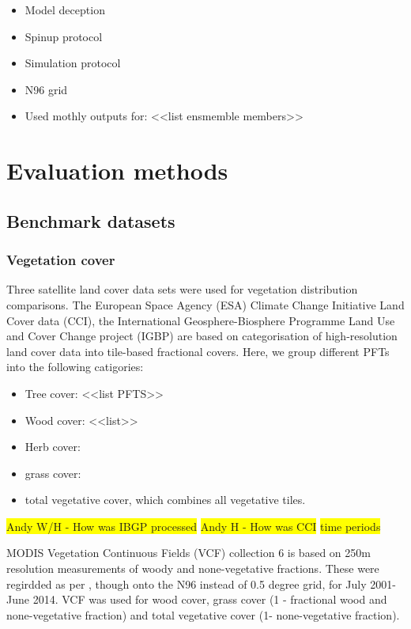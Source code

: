 \documentclass[bg, manuscript]{copernicus}
\newcommand{\hilight}[1]{\colorbox{yellow}{#1}}
\begin{document}
 
\begin{itemize}
    \item Model deception \citep{Sellar2019-bo}
    \item Spinup protocol \citep{yool2020spin}
    \item Simulation protocol \citep{sellar2020implementation}
    \item N96 grid
    \item Used mothly outputs for: <<list ensmemble members>>
\end{itemize}

\section{Evaluation methods}

\subsection{Benchmark datasets}

\subsubsection{Vegetation cover}
Three satellite land cover data sets were used for vegetation distribution comparisons. The European Space Agency (ESA) Climate Change Initiative Land Cover data (CCI)\cite{hartley2017uncertainty}, the International Geosphere-Biosphere Programme Land Use and Cover Change project (IGBP) \citep{Loveland2000-sx} are based on categorisation of high-resolution land cover data into tile-based fractional covers. Here, we group different PFTs into the following catigories:
\begin{itemize}
    \item Tree cover: <<list PFTS>>
    \item Wood cover: <<list>>
    \item Herb cover: 
    \item grass cover:
    \item total vegetative cover, which combines all vegetative tiles.
\end{itemize}

\hilight{Andy W/H - How was IBGP processed}
\hilight{Andy H - How was CCI}
\hilight{time periods}

MODIS Vegetation Continuous Fields (VCF) collection 6 \citep{Dimiceli_undated-el} is based on 250m resolution measurements of woody and none-vegetative fractions. These were regirdded as per \citep{Kelley2019-yu}, though onto the N96 instead of 0.5 degree grid, for July 2001- June 2014. VCF was used for wood cover, grass cover (1 - fractional wood and none-vegetative fraction) and  total vegetative cover (1- none-vegetative fraction).
\end{document}
